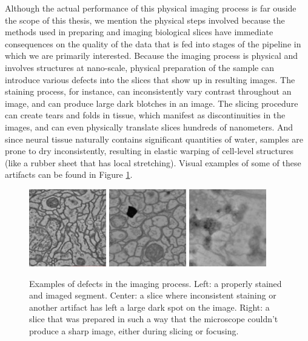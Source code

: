 Although the actual performance of this physical imaging process is far ouside the scope of this thesis, we mention the physical steps involved because the methods used in preparing and imaging biological slices have immediate consequences on the quality of the data that is fed into stages of the pipeline in which we are primarily interested. Because the imaging process is physical and involves structures at nano-scale, physical preparation of the sample can introduce various defects into the slices that show up in resulting images. The staining process, for instance, can inconsistently vary contrast throughout an image, and can produce large dark blotches in an image. The slicing procedure can create tears and folds in tissue, which manifest as discontinuities in the images, and can even physically translate slices hundreds of nanometers. And since neural tissue naturally contains significant quantities of water, samples are prone to dry inconsistently, resulting in elastic warping of cell-level structures (like a rubber sheet that has local stretching). Visual examples of some of these artifacts can be found in Figure \ref{fig:imaging_errors}.

\begin{figure}
\centering
\includegraphics[width=0.3\textwidth]{img/normal_example.png}
\includegraphics[width=0.3\textwidth]{img/stain_error.png}
\includegraphics[width=0.3\textwidth]{img/blurred_example.png}
\caption[Examples of defects in the imaging process.]{Examples of defects in the imaging process. Left: a properly stained and imaged segment. Center: a slice where inconsistent staining or another artifact has left a large dark spot on the image. Right: a slice that was prepared in such a way that the microscope couldn't produce a sharp image, either during slicing or focusing.}
\label{fig:imaging_errors}
\end{figure}


